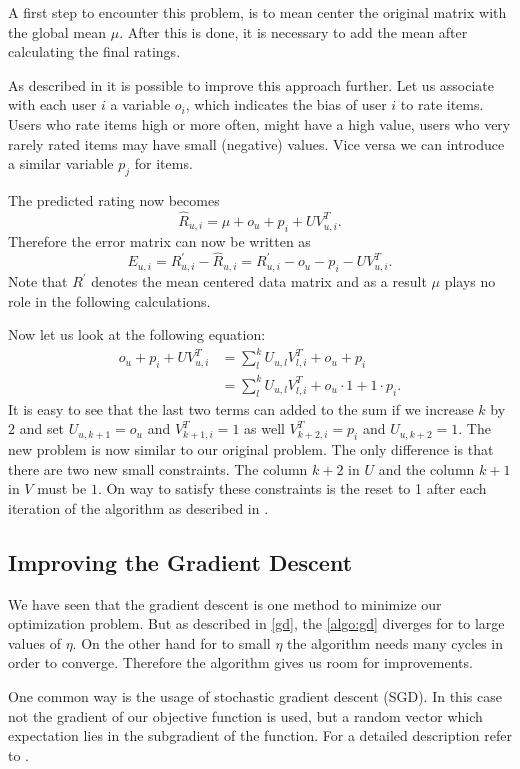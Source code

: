 \documentclass[DIV=14,twocolumn]{scrartcl}
\begin{document}
A first step to encounter this problem, is to mean center the original matrix with the global mean $\mu$. After this is done, it is necessary to add the mean after calculating the final ratings.

As described in \cite{Ag16} it is possible to improve this approach further. Let us associate with each user $i$ a variable $o_i$, which indicates the bias of user $i$ to rate items. Users who rate items high or more often, might have a high value, users who very rarely rated items may have small (negative) values. Vice versa we can introduce a similar variable $p_j$ for items.
 
The predicted rating now becomes $$\hat{R}_{u,i} = \mu + o_u + p_i + UV^T_{u,i}.$$ Therefore the error matrix can now be written as $$E_{u,i} = R_{u,i}^{'} - \hat{R}_{u,i} = R_{u,i}^{'} - o_u - p_i - UV^T_{u,i}.$$ Note that $R^{'}$ denotes the mean centered data matrix and as a result $\mu$ plays no role in the following calculations.

Now let us look at the following equation:
\begin{equation*}
\begin{split}
o_u + p_i + UV^T_{u,i} &= \sum_{l}^{k}U_{u,l}V^T_{l,i} + o_u + p_i\\ &= \sum_{l}^{k}U_{u,l}V^T_{l,i} + o_u\cdot 1 + 1\cdot p_i.
\end{split}
\end{equation*}
It is easy to see that the last two terms can added to the sum if we increase $k$ by $2$ and set $U_{u,k+1}=o_u$ and $V^T_{k+1,i}=1$ as well $V^T_{k+2,i}=p_i$ and $U_{u,k+2}=1$. The new problem is now similar to our original problem. The only difference is that there are two new small constraints. The column $k+2$ in $U$ and the column $k+1$ in $V$ must be $1$.
On way to satisfy these constraints is the reset to 1 after each iteration of the algorithm as described in \cite{Ag16}.

\subsection{Improving the Gradient Descent}\label{improvinggd}
We have seen that the gradient descent is one method to minimize our optimization problem. But as described in \autoref{gd}, the \autoref{algo:gd} diverges for to large values of $\eta$.
On the other hand for to small $\eta$ the algorithm needs many cycles in order to converge. Therefore the algorithm gives us room for improvements.

One common way is the usage of stochastic gradient descent (SGD). In this case not the gradient of our objective function is used, but a random vector which expectation lies in the subgradient of the function. For a detailed description refer to \cite{ShSh14}.
\end{document}
